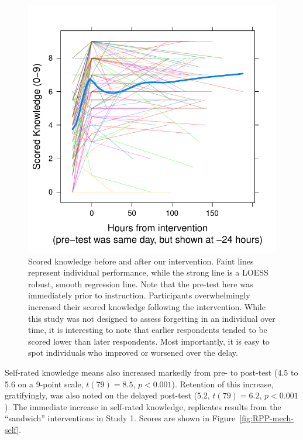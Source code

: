 \begin{figure}
    \centering
    \includegraphics{RPP-mech-scored.pdf}
    \caption{Scored knowledge before and after our intervention. Faint lines
        represent individual performance, while the strong line is a LOESS
        robust, smooth regression line. Note that the pre-test here was
        immediately prior to instruction. Participants overwhelmingly increased
        their scored knowledge following the intervention. While this study was
        not designed to assess forgetting in an individual over time, it is
        interesting to note that earlier respondents tended to be scored lower
        than later respondents. Most importantly, it is easy to spot individuals
        who improved or worsened over the delay.}
    \label{fig:RPP-mech-scored}
\end{figure}

Self-rated knowledge means also increased markedly from pre- to post-test (4.5
to 5.6 on a 9-point scale, $t(79)=8.5$, $p<0.001$). Retention of this increase,
gratifyingly, was also noted on the delayed post-test (5.2, $t(79)=6.2$,
$p<0.001$). The immediate increase in self-rated knowledge, replicates
results from the ``sandwich'' interventions in Study 1. Scores are shown in
Figure~\ref{fig:RPP-mech-self}.

